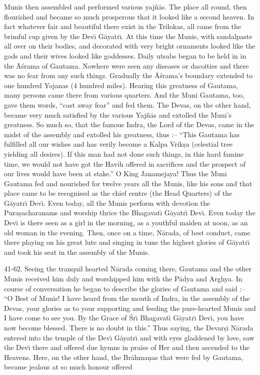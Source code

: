 Munis then assembled and performed various yaj\~n\=as. The place all round, then flourished and became so much prosperous that it looked like a second heaven. In fact whatever fair and beautiful there exist in the Trilokas, all came from the brimful cup given by the Dev\={\i} G\=ayatr\={\i}. At this time the Munis, with sandalpaste all over on their bodies, and decorated with very bright ornaments looked like the gods and their wives looked like goddesses. Daily utsabs began to be held in in the \=A\'srama of Gautama. Nowhere were seen any diseases or dacoities and there was no fear from any such things. Gradually the \=A\'srama's boundary extended to one hundred Yojanas (4 hundred miles). Hearing this greatness of Gautama, many persons came there from various quarters. And the Muni Gautama, too, gave them words, ``cast away fear'' and fed them. The Devas, on the other hand, became very much satisfied by the various Yaj\~n\=as and extolled the Muni's greatness. So much so, that the famous Indra, the Lord of the Devas, came in the midst of the assembly and extolled his greatness, thus :-- ``This Gautama has fulfilled all our wishes and has verily become a Kalpa Vrik\d{s}a (celestial tree yielding all desires). If this man had not done such things, in this hard famine time, we would not have got the Havih offered in sacrifices and the prospect of our lives would have been at stake.'' O King Janamejaya! Thus the Muni Gautama fed and nourished for twelve years all the Munis, like his sons and that place came to be recognised as the chief centre (the Head Quarters) of the G\=ayatr\={\i} Dev\={\i}. Even today, all the Munis perform with devotion the Pura\d{s}acharanams and worship thrice the Bhagavat\={\i} G\=ayatr\={\i} Dev\={\i}. Even today the Dev\={\i} is there seen as a girl in the morning, as a youthful maiden at noon, as an old woman in the evening. Then, once on a time, N\=arada, of best conduct, came there playing on his great lute and singing in tune the highest glories of G\=ayatr\={\i} and took his seat in the assembly of the Munis.

41-62. Seeing the tranquil hearted N\=arada coming there, Gautama and the other Munis received him duly and worshipped him with the P\=adya and Arghya. In course of conversation he began to describe the glories of Gautama and said :-- ``O Best of Munis! I have heard from the mouth of Indra, in the assembly of the Devas, your glories as to your supporting and feeding the pure-hearted Munis and I have come to see you. By the Grace of \'Sr\={\i} Bhagavat\={\i} G\=ayatr\={\i} Dev\={\i}, you have now become blessed. There is no doubt in this.'' Thus saying, the Devar\d{s}i N\=arada entered into the temple of the Dev\={\i} G\=ayatr\={\i} and with eyes gladdened by love, saw the Dev\={\i} there and offered due hymns in praise of Her and then ascended to the Heavens. Here, on the other hand, the Br\=ahma\d{n}as that were fed by Gautama, became jealous at so much honour offered

